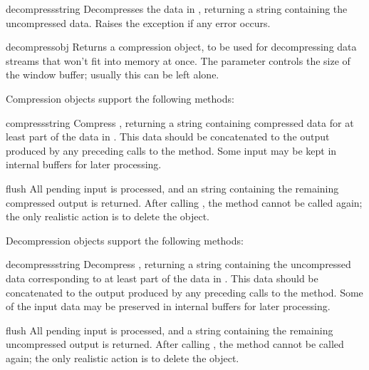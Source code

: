 \begin{funcdesc}{decompress}{string}
Decompresses the data in , returning a string containing
the uncompressed data.  Raises the  exception if any
error occurs.
\end{funcdesc}

\begin{funcdesc}{decompressobj}{}
Returns a compression object, to be used for decompressing data streams
that won't fit into memory at once.  The  parameter
controls the size of the window buffer; usually this can be left
alone.
\end{funcdesc}

Compression objects support the following methods:

\begin{funcdesc}{compress}{string}
Compress , returning a string containing compressed data
for at least part of the data in .  This data should be
concatenated to the output produced by any preceding calls to the
 method.  Some input may be kept in internal buffers
for later processing.
\end{funcdesc}

\begin{funcdesc}{flush}{}
All pending input is processed, and an string containing the remaining
compressed output is returned.  After calling , the
 method cannot be called again; the only realistic
action is to delete the object.
\end{funcdesc}

Decompression objects support the following methods:

\begin{funcdesc}{decompress}{string}
Decompress , returning a string containing the
uncompressed data corresponding to at least part of the data in
.  This data should be concatenated to the output produced
by any preceding calls to the
 method.  Some of the input data may be preserved
in internal buffers for later processing.
\end{funcdesc}

\begin{funcdesc}{flush}{}
All pending input is processed, and a string containing the remaining
uncompressed output is returned.  After calling , the
 method cannot be called again; the only realistic
action is to delete the object.
\end{funcdesc}

\begin{seealso}
\end{seealso}


